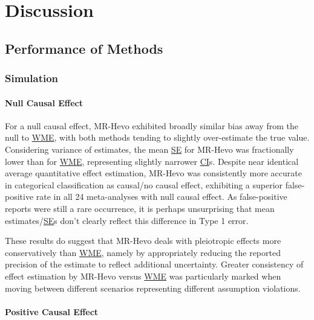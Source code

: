 \documentclass[
]{article}
\begin{document}
\section{Discussion}\label{discussion}

\subsection{Performance of Methods}\label{performance-of-methods}

\subsubsection{Simulation}\label{simulation}

\paragraph{Null Causal Effect}\label{null-causal-effect}

\leavevmode\newline For a null causal effect, MR-Hevo exhibited broadly similar bias away from the null to \hyperref[acronyms_WME]{WME}, with both methods tending to slightly over-estimate the true value. Considering variance of estimates, the mean \hyperref[acronyms_SE]{SE} for MR-Hevo was fractionally lower than for \hyperref[acronyms_WME]{WME}, representing slightly narrower \hyperref[acronyms_CI]{CI}s. Despite near identical average quantitative effect estimation, MR-Hevo was consistently more accurate in categorical classification as causal/no causal effect, exhibiting a superior false-positive rate in all 24 meta-analyses with null causal effect. As false-positive reports were still a rare occurrence, it is perhaps unsurprising that mean estimates/\hyperref[acronyms_SE]{SE}s don't clearly reflect this difference in Type 1 error.

These results do suggest that MR-Hevo deals with pleiotropic effects more conservatively than \hyperref[acronyms_WME]{WME}, namely by appropriately reducing the reported precision of the estimate to reflect additional uncertainty. Greater consistency of effect estimation by MR-Hevo versus \hyperref[acronyms_WME]{WME} was particularly marked when moving between different scenarios representing different assumption violations.

\paragraph{Positive Causal Effect}\label{positive-causal-effect}
\end{document}
